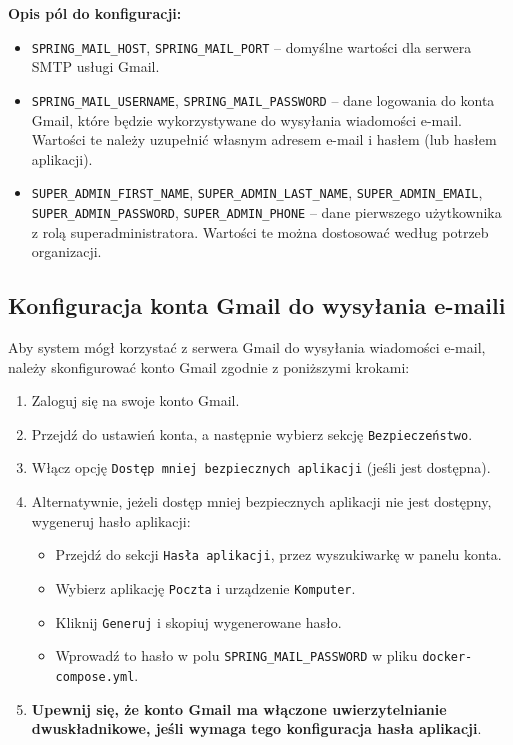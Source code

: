 \textbf{Opis pól do konfiguracji:}
\begin{itemize}
    \item \texttt{SPRING\_MAIL\_HOST}, \texttt{SPRING\_MAIL\_PORT} -- domyślne wartości dla serwera SMTP usługi Gmail.
    \item \texttt{SPRING\_MAIL\_USERNAME}, \texttt{SPRING\_MAIL\_PASSWORD} -- dane logowania do konta Gmail, które będzie wykorzystywane do wysyłania wiadomości e-mail. Wartości te należy uzupełnić własnym adresem e-mail i hasłem (lub hasłem aplikacji).
    \item \texttt{SUPER\_ADMIN\_FIRST\_NAME}, \texttt{SUPER\_ADMIN\_LAST\_NAME}, \texttt{SUPER\_ADMIN\_EMAIL}, \texttt{SUPER\_ADMIN\_PASSWORD}, \texttt{SUPER\_ADMIN\_PHONE} -- dane pierwszego użytkownika z rolą superadministratora. Wartości te można dostosować według potrzeb organizacji.
\end{itemize}

\subsection{Konfiguracja konta Gmail do wysyłania e-maili}

Aby system mógł korzystać z serwera Gmail do wysyłania wiadomości e-mail, należy skonfigurować konto Gmail zgodnie z poniższymi krokami:

\begin{enumerate}
    \item Zaloguj się na swoje konto Gmail.
    \item Przejdź do ustawień konta, a następnie wybierz sekcję \texttt{Bezpieczeństwo}.
    \item Włącz opcję \texttt{Dostęp mniej bezpiecznych aplikacji} (jeśli jest dostępna).
    \item Alternatywnie, jeżeli dostęp mniej bezpiecznych aplikacji nie jest dostępny, wygeneruj hasło aplikacji:
    \begin{itemize}
        \item Przejdź do sekcji \texttt{Hasła aplikacji}, przez wyszukiwarkę w panelu konta.
        \item Wybierz aplikację \texttt{Poczta} i urządzenie \texttt{Komputer}.
        \item Kliknij \texttt{Generuj} i skopiuj wygenerowane hasło.
        \item Wprowadź to hasło w polu \texttt{SPRING\_MAIL\_PASSWORD} w pliku \texttt{docker-compose.yml}.
    \end{itemize}
    \item \textbf{Upewnij się, że konto Gmail ma włączone uwierzytelnianie dwuskładnikowe, jeśli wymaga tego konfiguracja hasła aplikacji}.
\end{enumerate}


